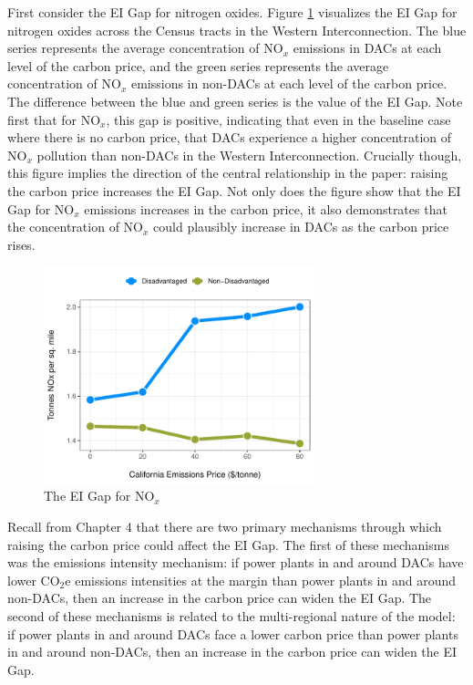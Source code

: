 First consider the EI Gap for nitrogen oxides. Figure \ref{ei_gap_bca_nox} visualizes the EI Gap for nitrogen oxides across the Census tracts in the Western Interconnection. The blue series represents the average concentration of NO$_x$ emissions in DACs at each level of the carbon price, and the green series represents the average concentration of NO$_x$ emissions in non-DACs at each level of the carbon price. The difference between the blue and green series is the value of the EI Gap. Note first that for NO$_x$, this gap is positive, indicating that even in the baseline case where there is no carbon price, that DACs experience a higher concentration of NO$_x$ pollution than non-DACs in the Western Interconnection. Crucially though, this figure implies the direction of the central relationship in the paper: raising the carbon price increases the EI Gap. Not only does the figure show that the EI Gap for NO$_x$ emissions increases in the carbon price, it also demonstrates that the concentration of NO$_x$ could plausibly increase in DACs as the carbon price rises. 

\begin{figure}
    \centering
    \caption{The EI Gap for NO$_x$ \label{ei_gap_bca_nox}}
    \includegraphics[width=0.7\textwidth]{figures/chapter5_figures/ei_gap_bca_nox.pdf}
\end{figure}

Recall from Chapter 4 that there are two primary mechanisms through which raising the carbon price could affect the EI Gap. The first of these mechanisms was the emissions intensity mechanism: if power plants in and around DACs have lower CO$_2$e emissions intensities at the margin than power plants in and around non-DACs, then an increase in the carbon price can widen the EI Gap. The second of these mechanisms is related to the multi-regional nature of the model: if power plants in and around DACs face a lower carbon price than power plants in and around non-DACs, then an increase in the carbon price can widen the EI Gap. 

